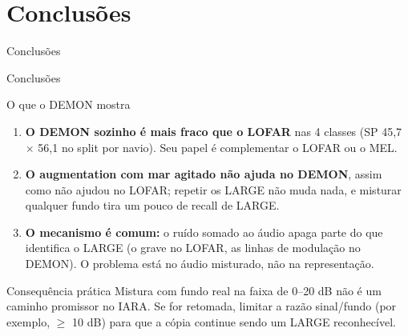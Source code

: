 \documentclass[aspectratio=169]{beamer}
\begin{document}
\section{Conclusões}

\begin{frame}
    \centering
    \huge Conclusões
\end{frame}

\begin{frame}{Conclusões}
    \footnotesize
    \begin{block}{\small O que o DEMON mostra}
        \scriptsize
        \begin{enumerate}
            \setlength{\itemsep}{2pt}
            \item \textbf{O DEMON sozinho é mais fraco que o LOFAR} nas 4 classes (SP 45,7 $\times$ 56,1 no split por navio). Seu papel é complementar o LOFAR ou o MEL.
            \item \textbf{O augmentation com mar agitado não ajuda no DEMON}, assim como não ajudou no LOFAR; repetir os LARGE não muda nada, e misturar qualquer fundo tira um pouco de recall de LARGE.
            \item \textbf{O mecanismo é comum:} o ruído somado ao áudio apaga parte do que identifica o LARGE (o grave no LOFAR, as linhas de modulação no DEMON). O problema está no áudio misturado, não na representação.
        \end{enumerate}
    \end{block}
    \begin{alertblock}{\small Consequência prática}
        \scriptsize
        Mistura com fundo real na faixa de 0--20 dB não é um caminho promissor no IARA. Se for retomada, limitar a razão sinal/fundo (por exemplo, $\geq$ 10 dB) para que a cópia continue sendo um LARGE reconhecível.
    \end{alertblock}
\end{frame}
\end{document}
